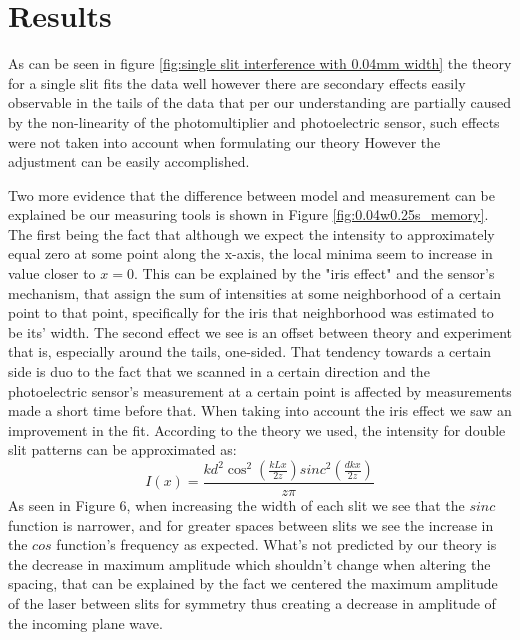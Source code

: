 \section{Results}\label{sec:results}
As can be seen in figure \ref{fig:single slit interference with 0.04mm width} the theory for a single slit fits the data well however there are
secondary effects easily observable in the tails of the data that per our understanding are partially caused by the non-linearity of the
photomultiplier and photoelectric sensor, such effects were not taken into account when formulating our theory
However the adjustment can be easily accomplished.



Two more evidence that the difference between model and measurement can be explained be our measuring tools is shown in Figure {\ref{fig:0.04w0.25s_memory}}.
The first being the fact that although we expect the intensity to approximately equal zero at some point along the x-axis, the local minima seem to increase in value closer to $x=0$.
This can be explained by the "iris effect" and the sensor's mechanism, that assign the sum of intensities at some neighborhood of a certain point to that point, specifically for the iris that neighborhood was estimated to be its' width.
The second effect we see is an offset between theory and experiment that is, especially around the tails, one-sided.
That tendency towards a certain side is duo to the fact that we scanned in a certain direction and the photoelectric sensor's measurement at a certain point is affected by measurements made a short time before that.
When taking into account the iris effect we saw an improvement in the fit.
According to the theory we used, the intensity for double slit patterns can be approximated as:
\begin{equation*}
    I(x)=\frac{kd^2\cos^2\left(\frac{kLx}{2z}\right)sinc^2\left(\frac{dkx}{2z}\right)}{z\pi}
\end{equation*}
As seen in Figure 6, when increasing the width of each slit we see that the $sinc$ function is narrower, and for greater spaces between slits we see the increase in the $cos$ function's frequency as expected.
What's not predicted by our theory is the decrease in maximum amplitude which shouldn't change when altering the spacing,
that can be explained by the fact we centered the maximum amplitude of the laser between slits for symmetry thus creating a decrease in amplitude of the incoming plane wave.

